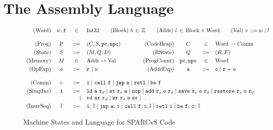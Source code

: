 \section{The \sparc{} Assembly Language}
\label{sec:modeling}
\begin{figure}[!t]
	\centering
	\small
	\[
		\begin{array}{rcclcrccl}
			\TYPE{(Word)} & \word, \lab{} & \in &
			\multicolumn{6}{l}
			{
				\TYPE{Int32} \qquad
				\TYPE{(Block)} \ \block \, \in \, \Ztype
				\qquad
				\TYPE{(Addr)} \ \loc \, \in \,
					\TYPE{Block} \times \TYPE{Word}
				\qquad
				\TYPE{(Val)} \ \val \,
					\define \, \word \sepline \loc
			}
			\\
			\\
			\TYPE{(Prog)} & \prog & \define &
				(\code, \state, \pc, \npc) & \qquad &
			\TYPE{(CodeHeap)} & \ \code \ & \in &
				\TYPE{Word} \rightharpoonup \TYPE{Comm}
			\\
			\\[-9pt]
			\TYPE{(State)} & \state & \define &
				(\mem, \Rstate, \DBuf) & &
			\TYPE{(RState)} & \Rstate & \define &
				(\RFile, \Wstack)
			\\
			\\[-9pt]
			\TYPE{(Memory)} & \mem & \in &
				\TYPE{Addr} \rightharpoonup \TYPE{Val}
			& &
			\TYPE{(ProgCount)} & \pc, \npc & \in & \TYPE{Word}
			\\
			\\[-9pt]
			\TYPE{(OpExp)} & \oexp & \define &
				\reg{} \sepline \word & &
			\TYPE{(AddrExp)} & \aexp & \define &
				\oexp \sepline \reg{} + \oexp \\
			\\
			\TYPE{(Comm)} & \comm & \define &
			\multicolumn{6}{l}
			{
				\simplins{} \sepline \call{} \ \lab{}
				\sepline \jmp{} \ \aexp \sepline \retl{} \sepline
				\be \ \lab{}
			} \\
			\\[-9pt]
			\TYPE{(SimpIns)} & \simplins{} & \define &
			\multicolumn{6}{l}
			{
				\ld{} \ \aexp \ \reg{d} \sepline
				\st{} \ \reg{s} \ \aexp \sepline
				\nop{} \sepline
				\cadd{} \ \reg{s} \ \oexp \ \reg{d} \sepline
				\csave{} \ \reg{s} \ \oexp \ \reg{d} \sepline
				\crestore{} \ \reg{s} \ \oexp \ \reg{d}
			} \\
			& & \ \ \ \ | &
			\multicolumn{6}{l}
			{
				\rd{} \ \sr \ \reg{d} \sepline
				\cwr{} \ \reg{s} \ \oexp \ \sr \sepline
				\dots
			} \\
			\\[-9pt]
			\TYPE{(InstrSeq)} & \cblk & \define &
			\multicolumn{6}{l}
			{
				\simplins{}; \, \cblk \sepline
				\jmp{} \ \aexp; \, \simplins{} \sepline
				\call{} \ \lab{}; \simplins{}; \cblk \sepline
				\retl{} \ \simplins{} \sepline
				\be{} \ \lab{}; \, \simplins{}; \, \cblk
			}
		\end{array}
	\]
	\vspace*{-0.5em}
	\caption{Machine States and Language for SPARCv8 Code}
	\label {fig:Machine States and Language for SPARC Code}
	\vspace*{-0.5em}
\end{figure}

